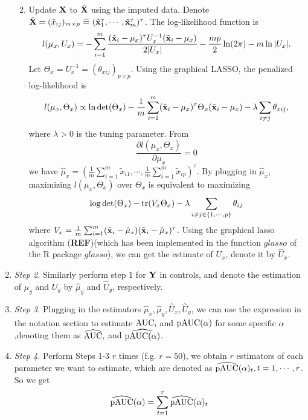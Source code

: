 \documentclass[a4,11pt,epsf, amssymb]{article}
\begin{document}
\begin{enumerate}
\begin{enumerate}
\begin{enumerate}
            \end{enumerate}
        \item Update $\bf X$ to $\tilde {\bf X}$ using the imputed data. Denote $\tilde {\bf X}=(\tilde x_{ij})_{m\times p}~\widehat{=}~(\tilde{\bf x}_1^\tau, \cdots, \tilde{\bf x}_m^\tau)^\tau$.
The log-likelihood function is
$$l(\mu_x, U_x)=-\sum_{i=1}^{m}{\frac{(\tilde{\bf x}_i - \mu_x)^{\tau}U_x^{-1}(\tilde{\bf x}_i - \mu_x)}{2 |U_x|}}-\frac{mp}{2}\ln(2\pi)-m\ln|U_x|.$$
Let $\Theta_x = U_x^{-1}=(\theta_{xij})_{p\times p}$. Using the graphical LASSO, the
 penalized log-likelihood is
$$l(\mu_x, \Theta_x)\propto \mathrm{ln} \det(\Theta_x) - \frac 1m \sum_{i = 1}^{m}(\tilde {\bf x}_i - \mu_x)^\tau\Theta_x(\tilde {\bf x}_i - \mu_x) - \lambda \sum_{i \ne j}\theta_{xij},$$
where $\lambda>0$ is the tuning parameter. From
$$\frac {\partial l(\mu_x, \Theta_x) }{\partial \mu_x} = 0$$
we have $\hat{\mu}_x = \left(\frac{1}{m}\sum\limits_{i=1}^m\tilde x_{i1},\cdots,   \frac{1}{m}\sum\limits_{i=1}^m\tilde x_{ip}\right)^\tau.$
By plugging in $\hat{\mu}_x$, maximizing $l(\mu_x, \Theta_x)$ over $\Theta_x$ is equivalent to maximizing
$$\mathrm{log}\det(\Theta_x) - \hbox{tr}(V_x\Theta_x) - \lambda \sum_{i \ne j\in\{1,\cdots,p\}}\theta_{ij}$$
where $V_x = \frac 1m \sum_{i = 1}^m (\tilde {\bf x}_i - \hat\mu_x)(\tilde {\bf x}_i  - \hat\mu_x)^\tau$.
Using the graphical lasso algorithm ({\bf REF})(which has been implemented in the function $glasso$ of the R package $glasso$),  we can get the estimate of $U_x$, denote it by $\hat U_x.$
    \end{enumerate}
    \item {\em Step 2.}
    Similarly perform step 1 for $\bf Y$ in controls, and denote the estimation of $\mu_y$ and $U_y$ by $\hat\mu_y$ and $\hat U_y$, respectively.
    \item {\em Step 3.}
    Plugging in the estimators $\hat{\mu}_x, \hat{\mu}_y, \hat{U}_x, \hat{U}_y$, we can use the expression in the notation section to estimate $\hbox{AUC},$ and $\hbox{pAUC}(\alpha)$ for some specific $\alpha$ ,denoting them as $\widehat{\hbox{AUC}},$ and $\widehat{\hbox{pAUC}(\alpha)}$.

    \item {\em Step 4.}
    Perform Steps 1-3 $r$ times (f.g. $r=50$), we obtain $r$ estimators of each parameter we want to estimate, which are denoted as $\widehat{\hbox{pAUC}}(\alpha)_t,t=1,\cdots,r$. So we get
$$\widehat{\hbox{pAUC}}(\alpha) = \sum_{t=1}^r\widehat{\hbox{pAUC}}(\alpha)_t$$

\end{enumerate}
\end{document}

